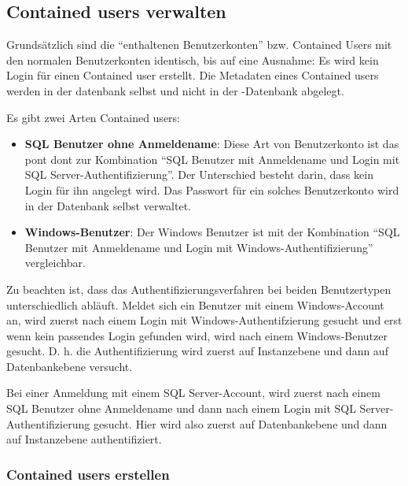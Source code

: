         \subsection{Contained users verwalten}
          Grundsätzlich sind die \enquote{enthaltenen Benutzerkonten} bzw.
          Contained Users mit den normalen Benutzerkonten identisch, bis auf
          eine Ausnahme: Es wird kein Login für einen Contained user erstellt.
          Die Metadaten eines Contained users werden in der datenbank selbst und
          nicht in der -Datenbank abgelegt.
          
          Es gibt zwei Arten Contained users:
          \begin{itemize}
            \item \textbf{SQL Benutzer ohne Anmeldename}: Diese Art von
            Benutzerkonto ist das pont dont zur Kombination \enquote{SQL
            Benutzer mit Anmeldename und Login mit SQL
            Server-Authentifizierung}. Der Unterschied besteht darin, dass kein
            Login für ihn angelegt wird. Das Passwort für ein solches
            Benutzerkonto wird in der Datenbank selbst verwaltet.
            \item \textbf{Windows-Benutzer}: Der Windows Benutzer ist mit
            der Kombination \enquote{SQL Benutzer mit Anmeldename und Login mit
            Windows-Authentifizierung} vergleichbar.
          \end{itemize}
          
          Zu beachten ist, dass das Authentifizierungsverfahren bei beiden
          Benutzertypen unterschiedlich abläuft. Meldet sich ein Benutzer mit
          einem Windows-Account an, wird zuerst nach einem Login mit
          Windows-Authentifzierung gesucht und erst wenn kein passendes Login
          gefunden wird, wird nach einem Windows-Benutzer gesucht. D. h. die
          Authentifizierung wird zuerst auf Instanzebene und dann auf
          Datenbankebene versucht.
          
          Bei einer Anmeldung mit einem SQL Server-Account, wird zuerst nach
          einem SQL Benutzer ohne Anmeldename und dann nach einem Login mit SQL
          Server-Authentifizierung gesucht. Hier wird also zuerst auf
          Datenbankebene und dann auf Instanzebene authentifiziert.
          \subsubsection{Contained users erstellen}
          
